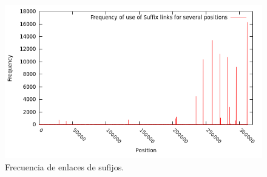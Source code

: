 \documentclass[12pt,a4paper]{article}
\begin{document}
\begin{figure}[h] 
\begin{center}
\includegraphics[scale=0.4]{histogram.png}
\caption{Frecuencia de enlaces de sufijos.}
\label{fig:hist_sl2}
\end{center}
\end{figure}
\end{document}

